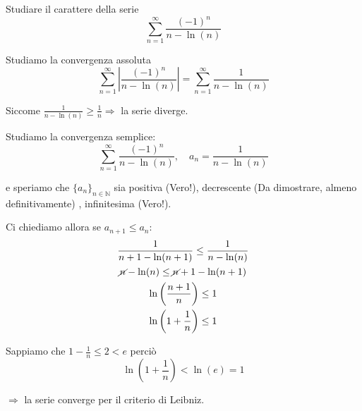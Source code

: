 \begin{exbar}
	\begin{example}
			Studiare il carattere della serie
		\begin{equation*}
			\sum_{n=1}^{\infty} \frac{(-1)^n}{n-\ln(n)}
		\end{equation*}
		
		Studiamo la convergenza assoluta
		\begin{equation*}
			\sum_{n=1}^{\infty} \left| \frac{(-1)^n} {n - \ln(n)} \right| = \sum_{n=1}^{\infty} \frac{1} {n - \ln(n)}
		\end{equation*}
		
		Siccome $\frac{1} {n - \ln(n)} \geq \frac{1}{n} \Rightarrow$ la serie diverge.
		
		Studiamo la convergenza semplice:
		\begin{equation*}
			\sum_{n=1}^{\infty} \frac{(-1)^n} {n - \ln(n)}, \quad a_n = \frac{1} {n - \ln(n)}
		\end{equation*}
		
		e speriamo che $\{a_n\}_{n\in\mathbb{N}}$ sia positiva (Vero!), decrescente (Da dimostrare, almeno definitivamente) , infinitesima (Vero!).
		
		Ci chiediamo allora se $a_{n+1}\leq a_{n}$:
		\begin{gather*}
			\frac{1} {n+1 - \ln(n+1)} \leq \frac{1} {n - \ln(n)} 
			\\
			\cancel{n} - \ln(n) \leq \cancel{n} + 1 - \ln(n+1) 
			\\
			\ln \left( \frac{n+1} {n} \right) \leq 1
			\\
			\ln \left( 1 + \frac{1}{n} \right) \leq 1
		\end{gather*} 
		
		Sappiamo che $1 - \frac{1}{n} \leq 2 < e$ perciò
		\begin{equation*}
			\ln \left( 1 + \frac{1} {n} \right) < \ln(e) = 1
		\end{equation*} 
		
		$\Rightarrow$ la serie converge per il criterio di Leibniz.
	\end{example}
\end{exbar}
		


